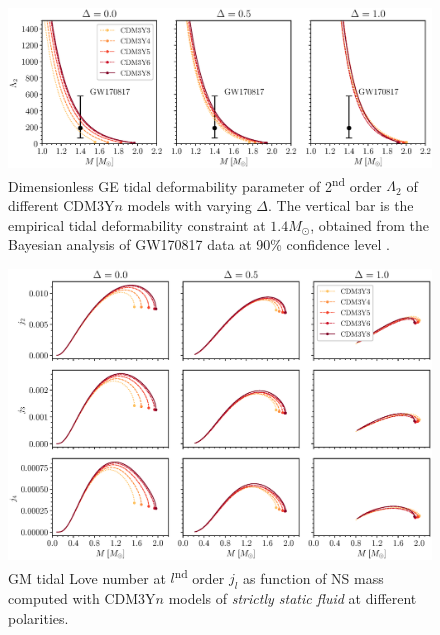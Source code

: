\begin{figure}[ht!]
    \centering
    \includegraphics[width=\textwidth]{fig/Lambda2.eps}
    \caption{Dimensionless \gls{GE} tidal deformability parameter of 2\textsuperscript{nd} order $\Lambda_2$ of different CDM3Y$n$ models with varying $\Delta$. The vertical bar is the empirical tidal deformability constraint at $1.4M_\odot$, obtained from the Bayesian analysis of GW170817 data at 90\% confidence level \cite{abbott2018gw170817}.}
    \label{fig:Lambda2}
\end{figure} 
\begin{figure}[ht!]
        \centering
        \includegraphics[width=\textwidth]{fig/jl_stat.eps}
        \caption{\gls{GM} tidal Love number at $l$\textsuperscript{nd} order $j_l$ as function of \gls{NS} mass computed with CDM3Y$n$ models of \emph{strictly static fluid} at different polarities.}
        \label{fig:jl_stat}
\end{figure} 
